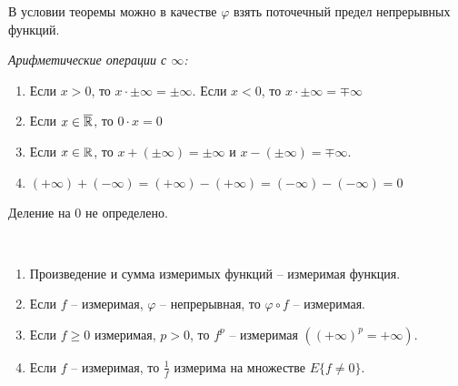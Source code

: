 \begin{corollary}
    В условии теоремы можно в качестве $\varphi$ взять поточечный предел
    непрерывных функций.
\end{corollary}

\begin{definition}
    \textit{Арифметические операции с $\infty$:}

    \begin{enumerate}
        \item Если $x> 0$, то $x\cdot \pm \infty = \pm \infty$.
        Если $x< 0$, то $x\cdot \pm \infty = \mp \infty$

        \item Если $x\in \overline{\mathbb{R}}$, то $0\cdot x =0$
        \item Если $x\in \mathbb{R}$, то $x+(\pm \infty)=\pm \infty$ и $x-(\pm \infty)=\mp \infty$.
        \item $(+\infty )+(-\infty)=(+\infty) - (+\infty) = (-\infty) -(-\infty) = 0$
    \end{enumerate}

    Деление на 0 не определено.
\end{definition}

\begin{theorem}~
    \begin{enumerate}
        \item Произведение и сумма измеримых функций – измеримая функция.
        \item Если $f$ – измеримая, $\varphi$ – непрерывная, то $\varphi \circ f$ – измеримая.
        \item Если $f\geq 0$ измеримая, $p>0$, то $f^p$ – измеримая $((+\infty)^p = +\infty)$.
        \item Если $f$ – измеримая, то $\frac{1}{f}$ измерима на множестве $E\{f\not = 0\}$.
    \end{enumerate}
\end{theorem}


